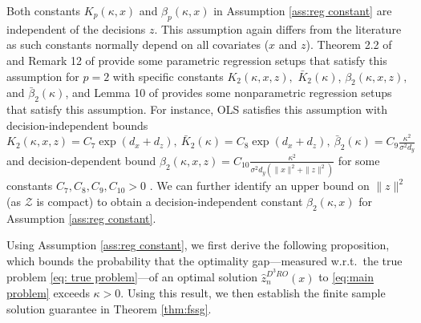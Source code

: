 \documentclass[onefignum,onetabnum]{siamart251216}
\begin{document}
   Both constants $K_{p}(\kappa,x)$ and $\beta_{p}(\kappa,x)$ in Assumption \ref{ass:reg constant} are independent of the decisions $z$. This assumption again differs from the literature as such constants normally depend on all covariates ($x$ and $z$). 
Theorem 2.2 of \cite{rigollet2023high} and Remark 12 of \cite{hsu2012random} provide some parametric regression setups that satisfy this assumption for $p=2$ with specific constants $K_{2}(\kappa,x,z),$ $\bar{K}_{2}(\kappa)$, $\beta_{2}(\kappa,x,z),$ and $\bar{\beta}_{2}(\kappa)$, and Lemma 10 of \cite{bertsimas2019predictions} provides some nonparametric regression setups that satisfy this assumption. For instance, OLS satisfies this assumption with decision-independent bounds $K_{2}(\kappa,x,z) = C_7 \exp(d_x + d_z),\ \bar{K}_{2}(\kappa) = C_8 \exp (d_x + d_z),\ \bar{\beta}_{2}(\kappa) = C_9 \frac{\kappa^2}{\sigma^2 d_y}$ and decision-dependent bound $\beta_{2}(\kappa,x,z) = C_{10} \frac{ \kappa^2}{\sigma^2 d_y (\|x\|^2 + \|z\|^2)}$ for some constants $C_7, C_8, C_9, C_{10} > 0$ \cite{rigollet2023high}. We can further identify an upper bound on $\|z\|^2$ (as $\mathcal{Z}$ is compact) to obtain a decision-independent constant $\beta_2(\kappa,x)$ for Assumption \ref{ass:reg constant}. 
 
 Using Assumption \ref{ass:reg constant}, we first derive the following proposition, which bounds the probability that the optimality gap---measured w.r.t.\ the true problem \eqref{eq: true problem}---of an optimal solution $\hat{z}_n^{D^3RO}(x)$ to \eqref{eq:main problem} exceeds $\kappa>0$. Using this result, we then establish the finite sample solution guarantee in Theorem \ref{thm:fssg}. 
\end{document}
